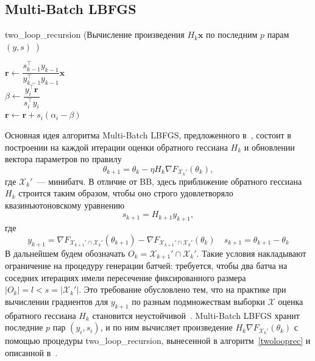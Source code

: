\documentclass[preprint,12pt]{elsarticle}
\begin{document}
\subsection{Multi-Batch LBFGS}\label{SS:2.4}
\begin{algorithm}[H]\label{twolooprec}
\caption {two\_loop\_recursion \newline
(Вычисление произведения $H_k\mathbf{x}$ по последним $p$ парам $(y, s)$~\cite{numopt})}
\SetAlgoLined
{}
 $\mathbf{r} \leftarrow \dfrac{s_{k-1}^\top y_{k-1}}{y_{k-1}^\top y_{k-1}}\mathbf{x}$\\
  {
    $\beta \leftarrow \dfrac{y_i^\top \mathbf{r}}{s_i^\top y_i}$\\
    $\mathbf{r} \leftarrow \mathbf{r} + s_i(\alpha_i - \beta)$\\
 }
\end{algorithm}
Основная идея алгоритма Multi-Batch LBFGS, предложенного в~\cite{multibatchLBFGS}, состоит в построении на каждой итерации оценки обратного гессиана $H_k$ и обновлении вектора параметров по правилу
\[ 
    \theta_{k+1} = \theta_k - \eta H_k \nabla F_{\mathcal{X}_k'}(\theta_k),
\]
где $\mathcal{X}_k'$~--- минибатч. 
В отличие от BB, здесь приближение обратного гессиана $H_k$ строится таким образом, чтобы оно строго удовлетворяло квазиньютоновскому уравнению
\[s_{k+1} = H_{k+1}y_{k+1},\]
где
\[y_{k+1} = \nabla F_{\mathcal{X}_{k+1}' \cap \mathcal{X}_k'}(\theta_{k+1}) - \nabla F_{\mathcal{X}_{k+1}' \cap \mathcal{X}_k'}(\theta_k) \quad s_{k+1} = \theta_{k+1} - \theta_k\]
В дальнейшем будем обозначать $O_k = \mathcal{X}_{k+1}' \cap \mathcal{X}_k'$. 
Такие условия накладывают ограничение на процедуру генерации батчей: требуется, чтобы два батча на соседних итерациях имели пересечение фиксированного размера $|O_k| = l < s = |\mathcal{X}_k'|$. 
Это требование обусловлено тем, что на практике при вычислении градиентов для $y_{k+1}$ по разным подмножествам выборки $\mathcal{X}$ оценка обратного гессиана $H_k$ становится неустойчивой~\cite{LBFGSunstable}. 
Multi-Batch LBFGS хранит последние $p$ пар $(y_i, s_i)$, и по ним вычисляет произведение $H_k \nabla F_{\mathcal{X}_k'}(\theta_k)$ с помощью процедуры two\_loop\_recursion, вынесенной в алгоритм~\ref{twolooprec} и описанной в~\cite{numopt}. 
\end{document}
